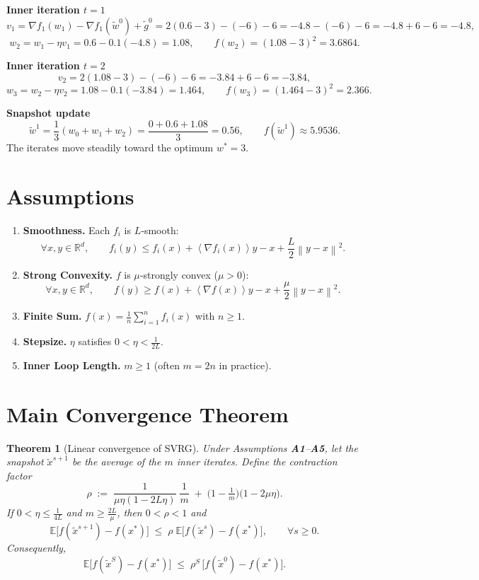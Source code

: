 \documentclass{article}
\newtheorem{theorem}{Theorem}
\newcommand{\E}{\mathbb{E}}
\newcommand{\R}{\mathbb{R}}
\newcommand{\norm}[1]{\left\|#1\right\|}
\newcommand{\inner}[1]{\left\langle#1\right\rangle}
\newcommand{\grad}{\nabla}
\begin{document}
\medskip
\noindent\textbf{Inner iteration $t=1$}
\[
v_{1}= \grad f_{1}(w_{1})-\grad f_{1}(\tilde w^{0})+\tilde g^{0}
=2(0.6-3)-(-6)-6=-4.8-(-6)-6=-4.8+6-6=-4.8,
\]
\[
w_{2}=w_{1}-\eta v_{1}=0.6-0.1(-4.8)=1.08,
\qquad f(w_{2})=(1.08-3)^{2}=3.6864.
\]

\medskip
\noindent\textbf{Inner iteration $t=2$}
\[
v_{2}=2(1.08-3)-(-6)-6=-3.84+6-6=-3.84,
\]
\[
w_{3}=w_{2}-\eta v_{2}=1.08-0.1(-3.84)=1.464,
\qquad f(w_{3})=(1.464-3)^{2}=2.366.
\]

\medskip
\noindent\textbf{Snapshot update}  
\[
\tilde w^{1}= \frac{1}{3}(w_{0}+w_{1}+w_{2}) = \frac{0+0.6+1.08}{3}=0.56,
\qquad f(\tilde w^{1})\approx 5.9536.
\]
The iterates move steadily toward the optimum $w^{*}=3$.

\section*{Assumptions}
\begin{enumerate}[label=\textbf{A\arabic*:}, leftmargin=*, itemsep=0.3ex]
\item \textbf{Smoothness.} Each $f_i$ is $L$‑smooth:
\[
\forall x,y\in\R^{d},\qquad 
f_i(y)\le f_i(x)+\inner{\grad f_i(x)}{y-x}+ \frac{L}{2}\norm{y-x}^{2}.
\tag{3}
\]
\item \textbf{Strong Convexity.} $f$ is $\mu$‑strongly convex ($\mu>0$):
\[
\forall x,y\in\R^{d},\qquad 
f(y)\ge f(x)+\inner{\grad f(x)}{y-x}+ \frac{\mu}{2}\norm{y-x}^{2}.
\tag{4}
\]
\item \textbf{Finite Sum.} $f(x)=\frac1n\sum_{i=1}^{n}f_i(x)$ with $n\ge 1$.
\item \textbf{Stepsize.} $\eta$ satisfies $0<\eta<\frac{1}{2L}$.
\item \textbf{Inner Loop Length.} $m\ge 1$ (often $m=2n$ in practice).
\end{enumerate}

\section*{Main Convergence Theorem}
\begin{theorem}[Linear convergence of SVRG]\label{thm:linear}
Under Assumptions \textbf{A1}–\textbf{A5}, let the snapshot $\tilde{x}^{s+1}$ be the
average of the $m$ inner iterates. Define the contraction factor
\[
\rho \;:=\; \frac{1}{\mu\eta(1-2L\eta)}\;\frac{1}{m}
\;+\; \bigl(1-\tfrac1m\bigr)\bigl(1-2\mu\eta\bigr).
\tag{5}
\]
If $0<\eta\le \frac{1}{4L}$ and $m\ge \frac{2L}{\mu}$, then $0<\rho<1$ and
\[
\E\!\bigl[f(\tilde{x}^{s+1})-f(x^{*})\bigr]\;\le\;\rho\;
\E\!\bigl[f(\tilde{x}^{s})-f(x^{*})\bigr],\qquad\forall s\ge0.
\tag{6}
\]
Consequently,
\[
\E\!\bigl[f(\tilde{x}^{S})-f(x^{*})\bigr]\;\le\;\rho^{S}\,
\bigl[f(\tilde{x}^{0})-f(x^{*})\bigr].
\tag{7}
\]
\end{theorem}
\end{document}
